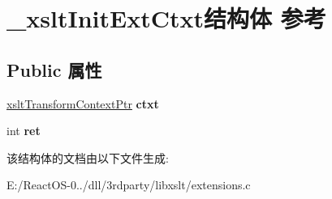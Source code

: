 \hypertarget{struct__xslt_init_ext_ctxt}{}\section{\+\_\+xslt\+Init\+Ext\+Ctxt结构体 参考}
\label{struct__xslt_init_ext_ctxt}
\subsection*{Public 属性}
\begin{DoxyCompactItemize}
\item 
\mbox{\label{struct__xslt_init_ext_ctxt_ab51d3e7e17cc6cca39d74da68d0e9d2d}} 
\hyperlink{struct__xslt_transform_context}{xslt\+Transform\+Context\+Ptr} {\bfseries ctxt}
\item 
\mbox{\label{struct__xslt_init_ext_ctxt_ac687684e64cc9fcd056ccd300b4f3d78}} 
int {\bfseries ret}
\end{DoxyCompactItemize}


该结构体的文档由以下文件生成\+:\begin{DoxyCompactItemize}
\item 
E\+:/\+React\+O\+S-\/0../dll/3rdparty/libxslt/extensions.\+c\end{DoxyCompactItemize}
